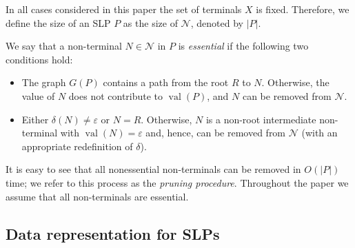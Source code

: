 \documentclass[12pt,oneside]{amsart}
\theoremstyle{definition}
\theoremstyle{case}
\def\CN{{\mathcal N}}
\DeclareMathOperator{\val}{val}
\begin{document}
In all cases considered in this paper the set of terminals $X$ is fixed.
Therefore, we define the size of an SLP $P$ as
the size of $\CN$, denoted by $|P|$.

We say that a non-terminal $N\in \CN$ in $P$ is \emph{essential} 
if the following two conditions hold:
\begin{itemize}
\item[(a)]
The graph $G(P)$ contains a path from the root $R$ to $N$.
Otherwise, the value of $N$ does not contribute to $\val(P)$,
and $N$ can be removed from $\CN$.
\item[(b)]
Either $\delta(N) \neq \varepsilon$ or $N = R$.
Otherwise, $N$ is a non-root intermediate non-terminal with
$\val(N) = \varepsilon$ and, hence, can be removed from $\CN$
(with an appropriate redefinition of $\delta$).
\end{itemize}
It is easy to see that all nonessential non-terminals can be removed in
$O(|P|)$ time; we refer to this process as 
the \emph{pruning procedure}.
Throughout the paper we assume that all non-terminals are essential.


\subsection{Data representation for SLPs}
\label{se:data-slps}
\end{document}
